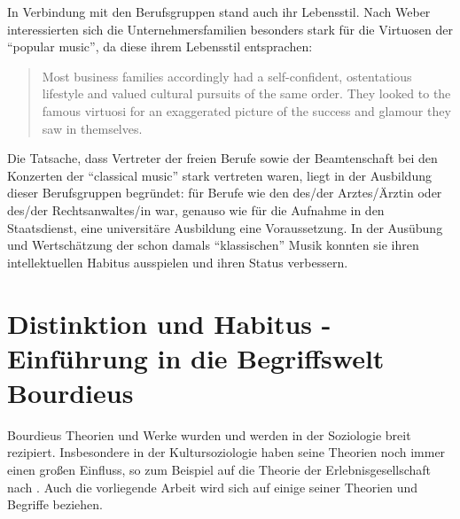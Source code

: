 \documentclass[a4paper, german, oneside]{scrbook}
\newcommand{\citet}[1]{\textcite{#1}}
\begin{document}
In Verbindung mit den Berufsgruppen stand auch ihr Lebensstil. Nach Weber interessierten sich die Unternehmersfamilien besonders stark für die Virtuosen der \enquote{popular music}, da diese ihrem Lebensstil entsprachen: \blockquote[{\cite[39]{weber_music_2004}}]{Most business families accordingly had a self-confident, ostentatious lifestyle and valued cultural pursuits of the same order. They looked to the famous virtuosi for an exaggerated picture of the success and glamour they saw in themselves.}

Die Tatsache, dass Vertreter der freien Berufe sowie der Beamtenschaft bei den Konzerten der \enquote{classical music} stark vertreten waren, liegt in der Ausbildung dieser Berufsgruppen begründet: für Berufe wie den des/der Arztes/Ärztin oder des/der Rechtsanwaltes/in war, genauso wie für die Aufnahme in den Staatsdienst, eine universitäre Ausbildung eine Voraussetzung. In der Ausübung und Wertschätzung der schon damals \enquote{klassischen} Musik konnten sie ihren intellektuellen Habitus ausspielen und ihren Status verbessern. \parencite[vgl.][67]{weber_music_2004}






\chapter{Distinktion und Habitus - Einführung in die Begriffswelt Bourdieus}
Bourdieus Theorien und Werke wurden und werden in der Soziologie breit rezipiert. Insbesondere in der Kultursoziologie haben seine Theorien noch immer einen großen Einfluss, so zum Beispiel auf die Theorie der Erlebnisgesellschaft nach \citet{schulze_erlebnisgesellschaft:_1993}. \parencite[vgl.][555]{joas_sozialtheorie:_2004} Auch die vorliegende Arbeit wird sich auf einige seiner Theorien und Begriffe beziehen. 
\end{document}

